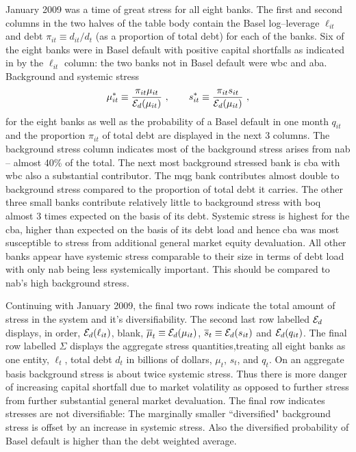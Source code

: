 \documentclass[authoryear]{elsarticle}
\newcommand{\Ex}{{\cal E}}
\newcommand{\cq}{\ , \qquad}
\begin{document}
January 2009 was a time of great stress for all eight banks.     The first  and second columns in the two halves of the table body contain the 
 Basel log--leverage $\ell_{it}$ and debt $\pi_{it}\equiv d_{it}/d_t$ (as a proportion of total debt) for each of the banks.  Six of the eight banks were in Basel default with positive capital shortfalls as indicated in by the $\ell_{it}$ column:   the two banks not in Basel default were wbc and aba.    Background and systemic stress
$$
\mu^*_{it} \equiv \frac{\pi_{it}\mu_{it}}{\Ex_d(\mu_{it})}\cq s^*_{it} \equiv \frac{\pi_{it}s_{it}}{\Ex_d(\mu_{it})}\ , 
$$
for the eight banks as well as the probability of a Basel default in one month $q_{it}$ and the proportion $\pi_{it}$ of total debt are displayed in the next 3 columns.    The background stress column indicates most of the background stress arises from nab -- almost 40\% of the total.   The next most background stressed bank is cba with wbc also a substantial contributor.   The mqg bank contributes almost double to background stress compared to the proportion of total debt  it carries.  The other three small banks contribute relatively little to background stress with boq  almost 3 times expected on the basis of its debt.   Systemic stress is highest for the cba, higher than expected on the basis of its debt load and hence cba was most susceptible to stress from additional general market equity devaluation.    All other banks appear have systemic stress comparable to their size in terms of debt load with only nab being less systemically important.    This should be compared to nab's high background stress.

Continuing with January 2009, the final two rows indicate the total amount of stress in the system and it's diversifiability.    
The second last  row labelled $\Ex_d$  displays, in order, $\Ex_d(\ell_{it})$, blank, $\overline{\mu}_t\equiv \Ex_d(\mu_{it})$, $\overline{s}_t\equiv\Ex_d(s_{it})$ and  $\Ex_d(q_{it})$.   The final row labelled $\Sigma$ displays the aggregate stress quantities,treating all eight banks as one entity, $\ell_t$, total debt $d_t$ in billions of dollars,  $\mu_t$, $s_t$, and  $q_t$.
On an aggregate basis background stress is about twice systemic stress.   Thus there is more danger of increasing capital shortfall due to market volatility  as opposed to further stress from further substantial general market devaluation.  The final row indicates stresses are not diversifiable:    The marginally  smaller  ``diversified"  background stress is offset by an increase in systemic stress.    Also the diversified probability of Basel default is higher than the debt weighted average.   
\end{document}
